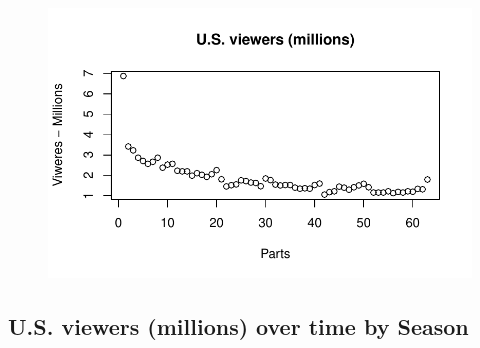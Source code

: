 \documentclass[
  letterpaper,
  DIV=11,
  numbers=noendperiod]{scrartcl}
\newenvironment{Shaded}{\begin{snugshade}}{\end{snugshade}}
\newcommand{\AttributeTok}[1]{\textcolor[rgb]{0.40,0.45,0.13}{#1}}
\newcommand{\FunctionTok}[1]{\textcolor[rgb]{0.28,0.35,0.67}{#1}}
\newcommand{\InformationTok}[1]{\textcolor[rgb]{0.37,0.37,0.37}{#1}}
\newcommand{\NormalTok}[1]{\textcolor[rgb]{0.00,0.23,0.31}{#1}}
\newcommand{\SpecialCharTok}[1]{\textcolor[rgb]{0.37,0.37,0.37}{#1}}
\newcommand{\StringTok}[1]{\textcolor[rgb]{0.13,0.47,0.30}{#1}}
\begin{document}
\begin{Shaded}
\end{Shaded}

\begin{figure}[H]

{\centering \includegraphics{Le_Nhat_Tung_files/figure-pdf/unnamed-chunk-5-1.pdf}

}

\end{figure}

\hypertarget{u.s.-viewers-millions-over-time-by-season}{%
\subsection{U.S. viewers (millions) over time by
Season}\label{u.s.-viewers-millions-over-time-by-season}}
\end{document}
